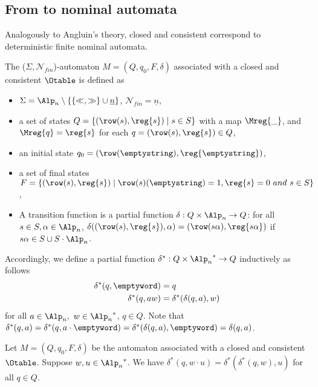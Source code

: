 \subsection{From \nOtable[s] to nominal automata}
Analogously to Angluin's theory, closed and consistent \nOtable[s]
correspond to deterministic finite nominal automata.
\begin{definition}
The ($\Sigma,\mathcal{N}_{fin}$)-automaton $M=(Q,q_0,F,\delta)$ associated with a closed and consistent \emph{\nOtable} $\Otable$ is defined as 
\begin{itemize}
\item{$\Sigma={\Alp_n}\setminus\{\{\ll,\gg\}\cup\underline{n}\}$, $\mathcal{N}_{fin}=\underline{n}$,}
\item{a set of states $Q=\{(\row(s),\reg{s})\mid s\in S \}$ with a map $\Mreg{\_}$, and $\Mreg{q}=\reg{s}$ for each $q=(\row(s),\reg{s})\in Q$,}
\item{an initial state $q_0=(\row(\emptystring),\reg{\emptystring})$,}
\item{a set of final states $F=\{(\row(s),\reg{s})\mid \row(s)(\emptystring)=1,\reg{s}=0\ and\ s\in S \}$, }
\item{A transition function is a partial function $\delta:Q\times {\Alp_n}\rightarrow Q$: for all $s\in S,\alpha\in {\Alp_n}$,
$\delta((\row(s),\reg{s}),\alpha)=
                   (\row(s\alpha),\reg{s\alpha})$ if $s\alpha\in S\cup S\cdot {\Alp_n}$.
}
\end{itemize}
\end{definition}


Accordingly, we define a partial function $\delta^\ast: Q\times {\Alp_n}^* \to Q$ inductively as follows
\begin{align*}
  \delta^\ast(q,\emptyword) &= q\\
  \delta^\ast(q,aw) &= \delta^\ast(\delta(q,a),w)
\end{align*}
for all $a\in \Alp_n,\ w\in {\Alp_n}^*$, $q\in
Q$.  Note that $\delta^*(q,a)=\delta^*(q,a\cdot
\emptyword)=\delta^*(\delta(q,a),
\emptyword)=\delta(q,a)$.
\begin{lemma}\label{lem:nTabledeltastar}
  Let $M=(Q,q_0,F,\delta)$ be the automaton associated with a closed and consistent \nOtable $\Otable$. Suppose $w,u\in{\Alp_n}^*$. We have  $\delta^\ast(q,w\cdot u)=\delta^\ast(\delta^\ast(q,w), u)$ for all $q\in Q$.
\end{lemma}

